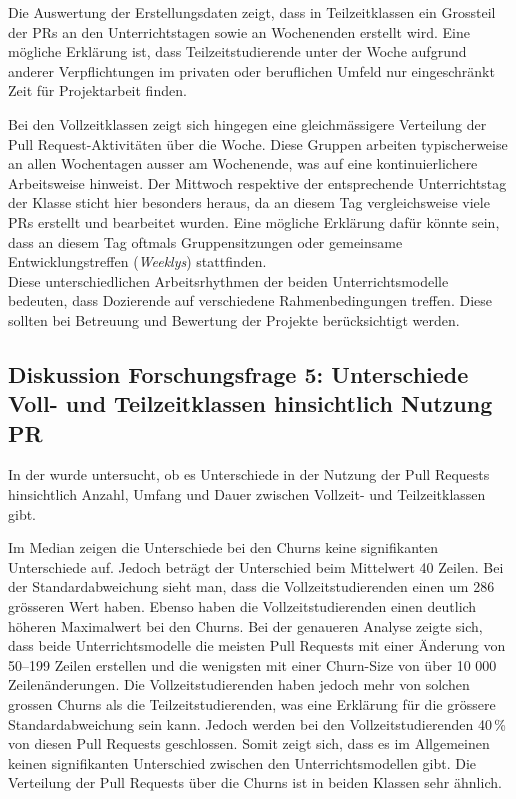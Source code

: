 Die Auswertung der Erstellungsdaten zeigt, dass in Teilzeitklassen ein Grossteil der PRs an den Unterrichtstagen sowie an Wochenenden erstellt wird. Eine mögliche Erklärung ist, dass Teilzeitstudierende unter der Woche aufgrund anderer Verpflichtungen im privaten oder beruflichen Umfeld nur eingeschränkt Zeit für Projektarbeit finden.

Bei den Vollzeitklassen zeigt sich hingegen eine gleichmässigere Verteilung der Pull Request-Aktivitäten über die Woche. Diese Gruppen arbeiten typischerweise an allen Wochentagen ausser am Wochenende, was auf eine kontinuierlichere Arbeitsweise hinweist. Der Mittwoch respektive der entsprechende Unterrichtstag der Klasse sticht hier besonders heraus, da an diesem Tag vergleichsweise viele PRs erstellt und bearbeitet wurden. Eine mögliche Erklärung dafür könnte sein, dass an diesem Tag oftmals Gruppensitzungen oder gemeinsame Entwicklungstreffen (\textit{Weeklys}) stattfinden. \\
Diese unterschiedlichen Arbeitsrhythmen der beiden Unterrichtsmodelle bedeuten, dass Dozierende auf verschiedene Rahmenbedingungen treffen. Diese sollten bei Betreuung und Bewertung der Projekte berücksichtigt werden.

\subsection{Diskussion Forschungsfrage 5: Unterschiede Voll- und Teilzeitklassen hinsichtlich Nutzung PR}
In der  wurde untersucht, ob es Unterschiede in der Nutzung der Pull Requests hinsichtlich Anzahl, Umfang und Dauer zwischen Vollzeit- und Teilzeitklassen gibt.

Im Median zeigen die Unterschiede bei den Churns keine signifikanten Unterschiede auf. Jedoch beträgt der Unterschied beim Mittelwert 40 Zeilen. Bei der Standardabweichung sieht man, dass die Vollzeitstudierenden einen um 286 grösseren Wert haben. Ebenso haben die Vollzeitstudierenden einen deutlich höheren Maximalwert bei den Churns. Bei der genaueren Analyse zeigte sich, dass beide Unterrichtsmodelle die meisten Pull Requests mit einer Änderung von 50–199 Zeilen erstellen und die wenigsten mit einer Churn-Size von über 10 000 Zeilenänderungen. Die Vollzeitstudierenden haben jedoch mehr von solchen grossen Churns als die Teilzeitstudierenden, was eine Erklärung für die grössere Standardabweichung sein kann. Jedoch werden bei den Vollzeitstudierenden 40\,\% von diesen Pull Requests geschlossen. Somit zeigt sich, dass es im Allgemeinen keinen signifikanten Unterschied zwischen den Unterrichtsmodellen gibt. Die Verteilung der Pull Requests über die Churns ist in beiden Klassen sehr ähnlich. 

